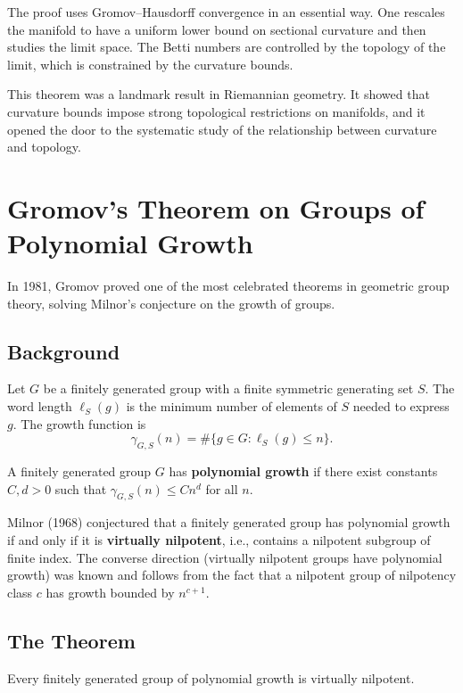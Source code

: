 The proof uses Gromov--Hausdorff convergence in an essential way. One rescales the manifold to have a uniform lower bound on sectional curvature and then studies the limit space. The Betti numbers are controlled by the topology of the limit, which is constrained by the curvature bounds.

This theorem was a landmark result in Riemannian geometry. It showed that curvature bounds impose strong topological restrictions on manifolds, and it opened the door to the systematic study of the relationship between curvature and topology.

\section{Gromov's Theorem on Groups of Polynomial Growth}

In 1981, Gromov proved one of the most celebrated theorems in geometric group theory, solving Milnor's conjecture on the growth of groups.

\subsection{Background}

Let \(G\) be a finitely generated group with a finite symmetric generating set \(S\). The word length \(\ell_S(g)\) is the minimum number of elements of \(S\) needed to express \(g\). The growth function is
\[
\gamma_{G,S}(n) = \#\{g \in G : \ell_S(g) \leq n\}.
\]

\begin{definition}
A finitely generated group \(G\) has \textbf{polynomial growth} if there exist constants \(C, d > 0\) such that \(\gamma_{G,S}(n) \leq C n^d\) for all \(n\).
\end{definition}

Milnor (1968) conjectured that a finitely generated group has polynomial growth if and only if it is \textbf{virtually nilpotent}, i.e., contains a nilpotent subgroup of finite index. The converse direction (virtually nilpotent groups have polynomial growth) was known and follows from the fact that a nilpotent group of nilpotency class \(c\) has growth bounded by \(n^{c+1}\).

\subsection{The Theorem}

\begin{theorem}[Gromov, 1981]
Every finitely generated group of polynomial growth is virtually nilpotent.
\end{theorem}

